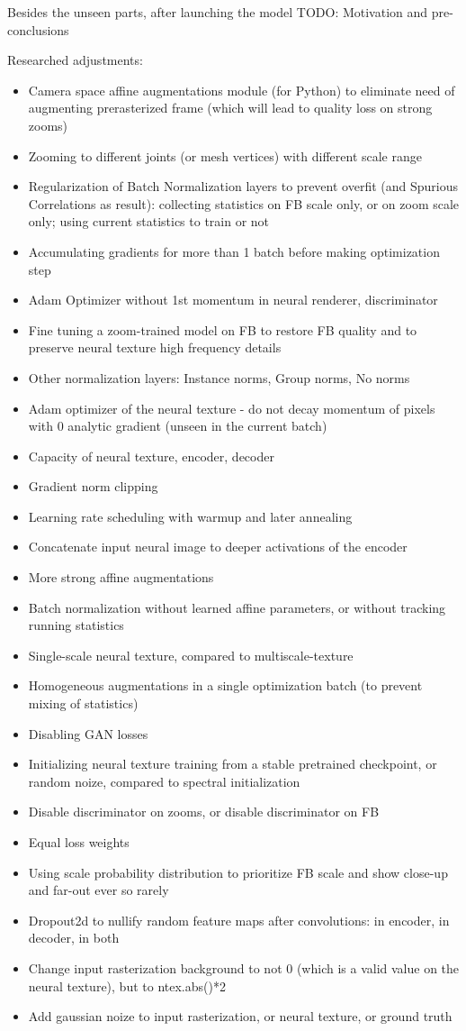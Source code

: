 Besides the unseen parts, after launching the model
\alert{TODO: Motivation and pre-conclusions}

Researched adjustments:
\begin{itemize}
	\item Camera space affine augmentations module (for Python) to eliminate need of augmenting prerasterized frame (which will lead to quality loss on strong zooms)
	\item Zooming to different joints (or mesh vertices) with different scale range 
	\item Regularization of Batch Normalization layers to prevent overfit (and Spurious Correlations as result): collecting statistics on FB scale only, or on zoom scale only; using current statistics to train or not
	\item Accumulating gradients for more than 1 batch before making optimization step
	\item Adam Optimizer without 1st momentum in neural renderer, discriminator
	\item Fine tuning a zoom-trained model on FB to restore FB quality and to preserve neural texture high frequency details
	\item Other normalization layers: Instance norms, Group norms, No norms
	\item Adam optimizer of the neural texture - do not decay momentum of pixels with 0 analytic gradient (unseen in the current batch)
	\item Capacity of neural texture, encoder, decoder
	\item Gradient norm clipping
	\item Learning rate scheduling with warmup and later annealing
	\item Concatenate input neural image to deeper activations of the encoder
	\item More strong affine augmentations 
	\item Batch normalization without learned affine parameters, or without tracking running statistics 
	\item Single-scale neural texture, compared to multiscale-texture
	\item Homogeneous augmentations in a single optimization batch (to prevent mixing of statistics)
	\item Disabling GAN losses
	\item Initializing neural texture training from a stable pretrained checkpoint, or random noize, compared to spectral initialization
	\item Disable discriminator on zooms, or disable discriminator on FB
	\item Equal loss weights
	\item Using scale probability distribution to prioritize FB scale and show close-up and far-out ever so rarely
	\item Dropout2d to nullify random feature maps after convolutions: in encoder, in decoder, in both
	\item Change input rasterization background to not 0 (which is a valid value on the neural texture), but to ntex.abs()*2
	\item Add gaussian noize to input rasterization, or neural texture, or ground truth
	
\end{itemize}